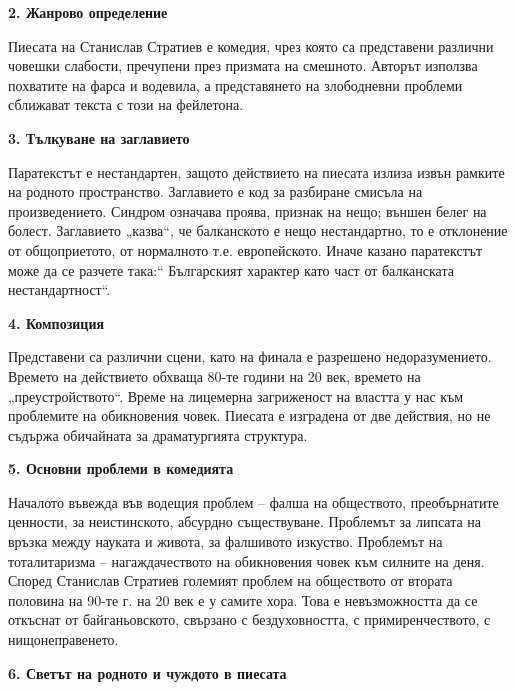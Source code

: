 \documentclass[12pt,a4paper]{article}
\begin{document}
\textbf{2. Жанрово определение}
\vspace{0.1cm}
 
\indent Пиесата на Станислав Стратиев е комедия, чрез която са представени различни човешки слабости, пречупени през призмата на смешното. Авторът използва похватите на фарса и водевила, а представянето на злободневни проблеми сближават текста с този на фейлетона.
\vspace{0.1cm}
 
\textbf{3. Тълкуване на заглавието}
\vspace{0.1cm}
 
\indent Паратекстът е нестандартен, защото действието на пиесата излиза извън рамките на родното пространство. Заглавието е код за разбиране смисъла на произведението. Синдром означава проява, признак на нещо; външен белег на болест. Заглавието „казва“, че балканското е нещо нестандартно, то е отклонение от общоприетото, от нормалното т.е. европейското. Иначе казано паратекстът може да се разчете така:“ Българският характер като част от балканската нестандартност“.
\vspace{0.1cm}
 
\textbf{4. Композиция}
\vspace{0.1cm}
 
\indent Представени са различни сцени, като на финала е разрешено недоразумението. Времето на действието обхваща 80-те години на 20 век, времето на „преустройството“. Време на лицемерна загриженост на властта у нас към проблемите на обикновения човек. Пиесата е изградена от две действия, но не съдържа обичайната за драматургията структура.
\vspace{0.1cm}
 
\textbf{5. Основни проблеми в комедията}
\vspace{0.1cm}
 
\indent Началото въвежда във водещия проблем – фалша на обществото, преобърнатите ценности, за неистинското, абсурдно съществуване. Проблемът за липсата на връзка между науката и живота, за фалшивото изкуство. Проблемът на тоталитаризма – нагаждачеството на обикновения човек към силните на деня. Според Станислав Стратиев големият проблем на обществото от втората половина на 90-те г. на 20 век е у самите хора. Това е невъзможността да се откъснат от байганьовското, свързано с бездуховността, с примиренчеството, с нищонеправенето.
\vspace{0.1cm}
 
\textbf{6. Светът на родното и чуждото в пиесата}
\vspace{0.1cm}
 
\end{document}
